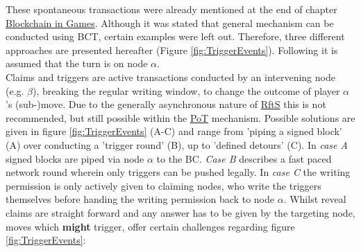 These spontaneous transactions were already mentioned at the end of chapter \hyperref[chap:BlockchainInGames]{Blockchain in Games}.
Although it was stated that general mechanism can be conducted using \gls{BCT}, certain examples were left out.
Therefore, three different approaches are presented hereafter (Figure \ref{fig:TriggerEvents}).
Following it is assumed that the turn is on node \textbf{$\alpha$}. \\
Claims and triggers are active transactions conducted by an intervening node (e.g. \textbf{$\beta$}), breaking the regular writing window, to change the outcome of player \textbf{$\alpha$}'s (sub-)move.
Due to the generally asynchronous nature of \hyperref[def:RftS]{RftS} this is not recommended, but still possible within the \hyperref[def:PoT]{PoT} mechanism.
Possible solutions are given in figure \ref{fig:TriggerEvents} (A-C) and range from 'piping a signed block' (A)
over conducting a 'trigger round' (B), up to 'defined detours' (C).
In \textit{case A} signed blocks are piped via node \textbf{$\alpha$} to the \gls{BC}.
\textit{Case B} describes a fast paced network round wherein only triggers can be pushed legally.
In \textit{case C} the writing permission is only actively given to claiming nodes, who write the triggers themselves before handing the writing permission back to node \textbf{$\alpha$}.
\noindent Whilst reveal claims are straight forward and any answer has to be given by the targeting node,
moves which \textbf{might} trigger, offer certain challenges regarding figure \ref{fig:TriggerEvents}:

